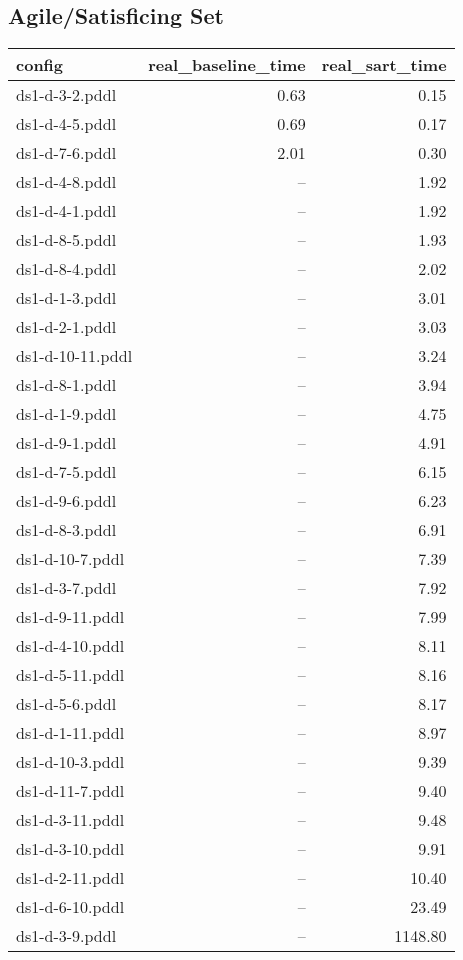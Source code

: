 \documentclass{article}
\begin{document}
                    \subsection*{Agile/Satisficing Set}
                    
                            \begin{center}
                            \scriptsize
                            \begin{tabular}{@{}l|r|r@{}}
                            config & real\_baseline\_time & real\_sart\_time\\\midrule
                             ds1-d-3-2.pddl&0.63&0.15\\
 ds1-d-4-5.pddl&0.69&0.17\\
 ds1-d-7-6.pddl&2.01&0.30\\
 ds1-d-4-8.pddl&--&1.92\\
 ds1-d-4-1.pddl&--&1.92\\
 ds1-d-8-5.pddl&--&1.93\\
 ds1-d-8-4.pddl&--&2.02\\
 ds1-d-1-3.pddl&--&3.01\\
 ds1-d-2-1.pddl&--&3.03\\
 ds1-d-10-11.pddl&--&3.24\\
 ds1-d-8-1.pddl&--&3.94\\
 ds1-d-1-9.pddl&--&4.75\\
 ds1-d-9-1.pddl&--&4.91\\
 ds1-d-7-5.pddl&--&6.15\\
 ds1-d-9-6.pddl&--&6.23\\
 ds1-d-8-3.pddl&--&6.91\\
 ds1-d-10-7.pddl&--&7.39\\
 ds1-d-3-7.pddl&--&7.92\\
 ds1-d-9-11.pddl&--&7.99\\
 ds1-d-4-10.pddl&--&8.11\\
 ds1-d-5-11.pddl&--&8.16\\
 ds1-d-5-6.pddl&--&8.17\\
 ds1-d-1-11.pddl&--&8.97\\
 ds1-d-10-3.pddl&--&9.39\\
 ds1-d-11-7.pddl&--&9.40\\
 ds1-d-3-11.pddl&--&9.48\\
 ds1-d-3-10.pddl&--&9.91\\
 ds1-d-2-11.pddl&--&10.40\\
 ds1-d-6-10.pddl&--&23.49\\
 ds1-d-3-9.pddl&--&1148.80
                            \end{tabular}
                            \end{center}
                    
\end{document}
